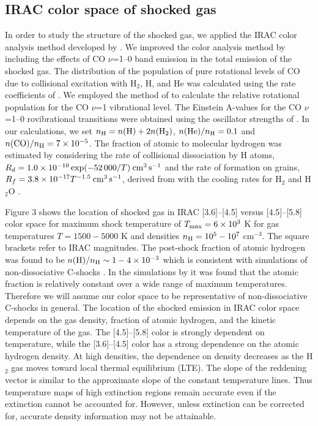\documentclass[iop]{emulateapj}
\begin{document}
\subsection{IRAC color space of shocked gas}

In order to study the structure of the  shocked gas, we applied the IRAC
color analysis method developed by \citet{yba2009}. We improved the color
analysis method by including the effects of CO $\nu$=1--0 band emission in
the total emission of the shocked gas. The distribution of the
population of pure rotational levels of CO due to collisional
excitation with H$_2$, H, and He was calculated using the rate
coefficients of \citet{dra1984}. We employed the method of
\citet{gon2002} to calculate the relative rotational population for
the CO $\nu$=1 vibrational level. The Einstein A-values for the CO
$\nu$=1--0 rovibrational transitions were obtained using the
oscillator strengths of \citet{hur1993}. In our calculations, we set
$n_{\rm{H}} = n({\rm{H}}) +  2n({\rm{H}}_{2})$, 
$n({\rm{He}})/ n_{\rm{H}} = 0.1 $ and $n({\rm{CO}})/ n_{\rm{H}}=7
\times 10^{-5}$. The fraction of atomic to molecular hydrogen was
estimated by considering the rate of collisional dissociation
by H atoms, 
$R_{d} = 1.0 \times 10^{-10} \exp(-52\,000/T) \: {\rm{cm^{3}\,s^{-1}}}
$
\citep{leb2002} and the rate of formation on grains, 
$
R_{f} = 3.8 \times 10^{-17} T^{-1.5} \: {\rm{cm^{3}\,s^{-1}}}
$, derived from \citet{hol1979} with the cooling
rates for H$_2$ and H$_2$O \citep{leb1999,leb2002}.

Figure 3 shows the location of shocked gas in IRAC [3.6]--[4.5] versus
[4.5]--[5.8] color space for maximum shock temperature of
$T_{\rm{max}} = 6 \times 10^{3}$ K for gas temperatures $T =
1500-5000$ K and densities $n_{\rm{H}} = 10^{5}-10^{7}$
cm$^{-3}$. The square brackets refer to IRAC magnitudes.
The post-shock fraction of atomic hydrogen was found to be
$n({\rm{H}})/n_{\rm{H}} \sim 1-4 \times 10^{-3}$ which is consistent
with simulations of non-dissociative C-shocks \citep{wil2000}.
In the simulations by \citet{wil2000} it was found that the
atomic fraction is relatively constant over  a wide range of maximum
temperatures. Therefore we will assume our color space to be
representative of non-dissociative C-shocks in general.  
The location of the shocked emission in
IRAC color space depends on the gas density, fraction of atomic
hydrogen, and the kinetic temperature of the gas.  The [4.5]--[5.8]
color is strongly dependent on temperature, while the [3.6]--[4.5]
color has a strong dependence on the atomic hydrogen density. At high
densities, the dependence on density decreases as the H$_2$ gas moves toward
local thermal equilibrium (LTE). 
The slope of the reddening vector is similar to the approximate slope of 
the constant temperature lines. Thus temperature maps of high extinction
regions remain accurate even if the extinction cannot be accounted for. 
However, unless extinction can be corrected for, accurate density
information may not be attainable.
\end{document}
